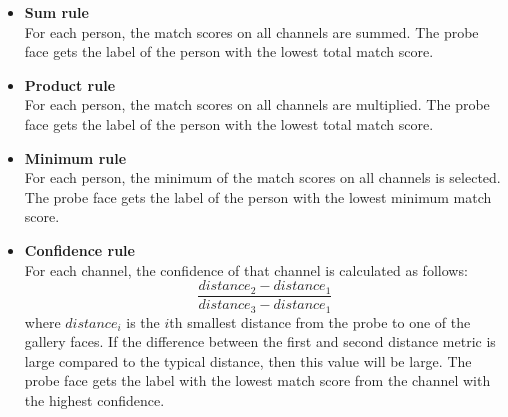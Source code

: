 \documentclass[]{article}
\begin{document}

\begin{itemize}
	\item \textbf{Sum rule}\\For each person, the match scores on all channels are summed. The probe face gets the label of the person with the lowest total match score.
	\item \textbf{Product rule}\\For each person, the match scores on all channels are multiplied. The probe face gets the label of the person with the lowest total match score. 
	\item \textbf{Minimum rule}\\For each person, the minimum of the match scores on all channels is selected. The probe face gets the label of the person with the lowest minimum match score.
	\item \textbf{Confidence rule}\\ For each channel, the confidence of that channel is calculated as follows:
	\[\frac{distance_2 - distance_1}{distance_3 - distance_1}\] where $distance_i$ is the $i$th smallest distance from the probe to one of the gallery faces. If the difference between the first and second distance metric is large compared to the typical distance, then this value will be large.
	The probe face gets the label with the lowest match score from the channel with the highest confidence.
\end{itemize}
\end{document}
